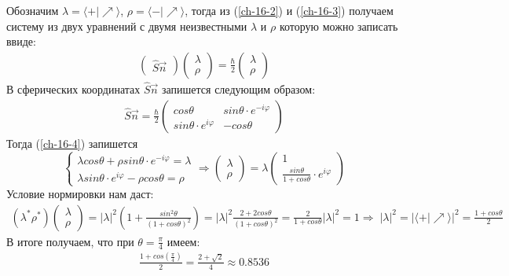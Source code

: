 \documentclass[__main__.tex]{subfiles}
\begin{document}
	Обозначим $\lambda = \langle+|\nearrow\rangle$, $\rho = \langle-|\nearrow\rangle$, тогда из (\ref{ch-16-2}) и (\ref{ch-16-3}) получаем систему из двух уравнений с двумя неизвестными $\lambda$ и $\rho$ которую можно записать ввиде:
	\begin{gather}
		\label{ch-16-4}
		\begin{pmatrix} \hat{S}\vec{n} \end{pmatrix}\begin{pmatrix} \lambda \\ \rho \end{pmatrix} = \frac{\hbar}{2}	\begin{pmatrix} \lambda \\ \rho\end{pmatrix}
	\end{gather}
	В сферических координатах $\hat{S}\vec{n}$ запишется следующим образом:
	\begin{gather*}
		\hat{S}\vec{n} = \frac{\hbar}{2}\begin{pmatrix} cos\theta & sin\theta\cdot e^{-i\varphi} \\ sin\theta\cdot e^{i\varphi} & -cos\theta \end{pmatrix}
	\end{gather*}
	Тогда (\ref{ch-16-4}) запишется
	\begin{equation*}
		\begin{cases}
			\lambda cos\theta + \rho sin\theta\cdot e^{-i\varphi} = \lambda \\
			\lambda sin\theta\cdot e^{i\varphi} - \rho cos\theta = \rho
		\end{cases}
		\Rightarrow
			\begin{pmatrix} \lambda \\ \rho \end{pmatrix} = \lambda	\begin{pmatrix} 1 \\ \frac{sin\theta}{1+cos\theta}\cdot e^{i\varphi}\end{pmatrix}
	\end{equation*}
	Условие нормировки нам даст:
	\begin{gather*}
		\left(\lambda^{*}\rho^{*}\right)\begin{pmatrix}\lambda \\ \rho \end{pmatrix} = |\lambda|^2\left(1+\frac{sin^2\theta}{(1+cos\theta)^2}\right) = |\lambda|^2\frac{2+2cos\theta}{(1+cos\theta)^2} = \frac{2}{1+cos\theta}|\lambda|^2 = 1  \Rightarrow \; |\lambda|^2 = \left|\langle+|\nearrow\rangle\right|^2 = \frac{1+cos\theta}{2}
	\end{gather*}
	В итоге получаем, что при $\theta = \frac\pi4$ имеем:
	\begin{gather*}
		\frac{1+cos\left(\frac{\pi}{4}\right)}{2} = \frac{2+\sqrt{2}}{4} \approx 0.8536
	\end{gather*}
\end{document}
